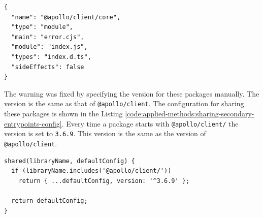 \ifshowListings
\begin{listing}[H]
  \begin{verbatim}
{
  "name": "@apollo/client/core",
  "type": "module",
  "main": "error.cjs",
  "module": "index.js",
  "types": "index.d.ts",
  "sideEffects": false
}
  \end{verbatim}
  \caption{The content of \texttt{package.json} from \texttt{@apollo/client/core}.}\label{code:applied-methods:package-json-apollo-client-core}
\end{listing}
\fi

\noindent The warning was fixed by specifying the version for these packages manually. The version is the same as that of \texttt{@apollo/client}. The configuration for sharing these packages is shown in the Listing \ref{code:applied-methods:sharing-secondary-entrypoints-config}. Every time a package starts with \texttt{@apollo/client/} the version is set to \texttt{3.6.9}. This version is the same as the version of \texttt{@apollo/client}.

\ifshowListings
\begin{listing}[H]
  \begin{verbatim}
shared(libraryName, defaultConfig) {
  if (libraryName.includes('@apollo/client/'))
    return { ...defaultConfig, version: '^3.6.9' };

  return defaultConfig;
}
  \end{verbatim}
  \caption{Specify the version for the secondary entry points for the \texttt{@apollo/client} package.}\label{code:applied-methods:sharing-secondary-entrypoints-config}
\end{listing}
\fi
